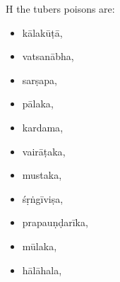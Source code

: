 \begin{translation}
        \item[H]
        the tubers poisons are:
        \begin{itemize}
             \item \gls{kālakūṭā},
\item \gls{vatsanābha},
\item \gls{sarṣapa},
\item \gls{pālaka},
\item \gls{kardama},
\item \gls{vairāṭaka},
\item \gls{mustaka},
\item \gls{śṛṅgīviṣa},
\item \gls{prapauṇḍarīka},
\item \gls{mūlaka},
\item \gls{hālāhala},

\end{itemize}
\end{translation}
